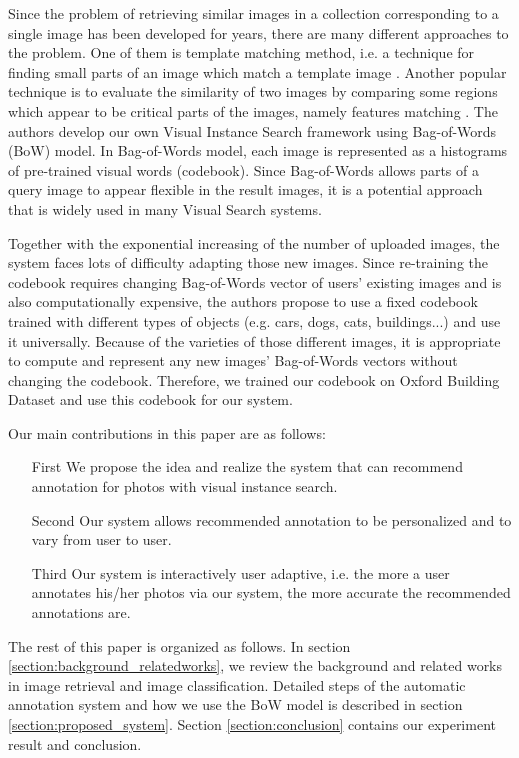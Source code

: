 Since the problem of retrieving similar images in a collection corresponding to a single image has been developed for years, there are many different approaches to the problem. One of them is template matching method, i.e. a technique for finding small parts of an image which match a template image \cite{brunelli_template_matching,Rosenfeld4309663,Gharavi913587}. Another popular technique is to evaluate the similarity of two images by comparing some regions which appear to be critical parts of the images, namely features matching \cite{Belongie710790,Rubner,Viola990517}. The authors develop our own Visual Instance Search framework using Bag-of-Words (BoW) model. In Bag-of-Words model, each image is represented as a histograms of pre-trained visual words (codebook). Since Bag-of-Words allows parts of a query image to appear flexible in the result images, it is a potential approach that is widely used in many Visual Search systems. 

Together with the exponential increasing of the number of uploaded images, the system faces lots of difficulty adapting those new images. Since re-training the codebook requires changing Bag-of-Words vector of users' existing images and is also computationally expensive, the authors propose to use a fixed codebook trained with different types of objects (e.g. cars, dogs, cats, buildings...) and use it universally. Because of the varieties of those different images, it is appropriate to compute and represent any new images' Bag-of-Words vectors without changing the codebook. Therefore, we trained our codebook on Oxford Building Dataset and use this codebook for our system.

Our main contributions in this paper are as follows:
\begin{enumerate}
	\item[First] We propose the idea and realize the system that can recommend annotation for photos with visual instance search.
	\item[Second] Our system allows recommended annotation to be personalized and to vary from user to user.
	\item[Third] Our system is interactively user adaptive, i.e. the more a user annotates his/her photos via our system, the more accurate the recommended annotations are.
\end{enumerate}

The rest of this paper is organized as follows. In section \ref{section:background_relatedworks}, we review the background and related works in image retrieval and image classification. Detailed steps of the automatic annotation system and how we use the BoW model is described in section \ref{section:proposed_system}. Section \ref{section:conclusion} contains our experiment result and conclusion.
